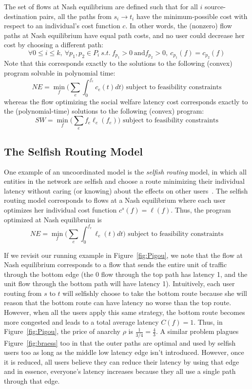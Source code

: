 The set of flows at Nash equilibrium are defined such that for all $i$ source-destination pairs, all the paths from $s_i \to t_i$ have the minimum-possible cost with respect to an individual's cost function $c$. In other words, the (nonzero) flow paths at Nash equilibrium have equal path costs, and no user could decrease her cost by choosing a different path:
$$\forall 0\le i \le k,~\forall p_1, p_2\in P_i~s.t.~f_{p_1} > 0~\text{and} f_{p_2} > 0,~ c_{p_1}(f) = c_{p_2}(f)$$
Note that this corresponds exactly to the solutions to the following (convex) program solvable in polynomial time:
$$NE = \min_f\Big(\sum_e \int_0^{f_e} c_e(t)dt\Big) \text{ subject to feasibility constraints}$$
whereas the flow optimizing the social welfare latency cost corresponds exactly to the (polynomial-time) solutions to the following (convex) program: 
$$SW = \min_f\Big(\sum_e f_e\ell_e(f_e)\Big) \text{ subject to feasibility constraints}$$

\subsection{The Selfish Routing Model}
One example of an uncoordinated model is the \emph{selfish routing} model, in which all entities in the network are selfish and choose a route minimizing their individual latency without caring (or knowing) about the effects on other users~\cite{tardos}.
The selfish routing model corresponds to flows at a Nash equilibrium where each user optimizes her individual cost function
$c^s(f) = \ell(f)$.
Thus, the program optimized at Nash equilibruim is
$$NE = \min_f\Big(\sum_e \int_0^{f_e} \ell_e(t)dt\Big) \text{ subject to feasibility constraints}$$

If we revisit our running example in Figure~\ref{fig:Pigou}, we note that the flow at Nash equilibrium corresponds to a flow that sends the entire unit of traffic through the bottom edge (the 0 flow through the top path has latency 1, and the unit flow through the bottom path will have latency 1).
Intuitively, each user routing from $s$ to $t$ will selfishly choose to take the bottom route because she will reason that the bottom route can have latency no worse than the top route. However, when all the users apply this same strategy, the bottom route becomes more congested and leads to a total average latency $C(f) = 1$.
Thus, in Figure~\ref{fig:Pigou}, the price of anarchy $\rho$ is $\frac{1}{3/4} = \frac{4}{3}$. A similar problem plagues Figure~\ref{fig:braess} too in that the outer paths are optimal and used by selfish users too as long as the 
middle low latency edge isn't introduced. However, once it is reduced, all users believe they can reduce their latency by using that edge and in essence, everyone's latency increases because they all use a single path through that
edge.

